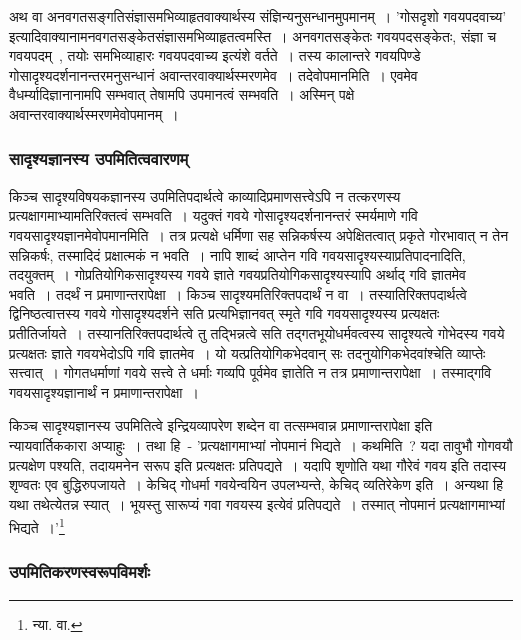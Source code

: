 		अथ वा अनवगतसङ्गतिसंज्ञासमभिव्याहृतवाक्यार्थस्य संज्ञिन्यनुसन्धानमुपमानम्~। 'गोसदृशो गवयपदवाच्य' इत्यादिवाक्यानामनवगतसङ्केतसंज्ञासमभिव्याहृतत्वमस्ति~। अनवगतसङ्केतः गवयपदसङ्केतः, संज्ञा च गवयपदम्~, तयोः समभिव्याहारः गवयपदवाच्य इत्यंशे वर्तते~।‌ तस्य कालान्तरे गवयपिण्डे गोसादृश्यदर्शनानन्तरमनुसन्धानं अवान्तरवाक्यार्थस्मरणमेव~। तदेवोपमानमिति~। एवमेव वैधर्म्यादिज्ञानानामपि सम्भवात् तेषामपि उपमानत्वं सम्भवति~। अस्मिन् पक्षे अवान्तरवाक्यार्थस्मरणमेवोपमानम्~।

		\subsubsection{सादृश्यज्ञानस्य उपमितित्ववारणम्}

		किञ्च सादृश्यविषयकज्ञानस्य उपमितिपदार्थत्वे काव्यादिप्रमाणसत्त्वेऽपि न तत्करणस्य प्रत्यक्षागमाभ्यामतिरिक्तत्वं सम्भवति~। यदुक्तं गवये गोसादृश्यदर्शनानन्तरं स्मर्यमाणे गवि गवयसादृश्यज्ञानमेवोपमानमिति~। तत्र प्रत्यक्षे धर्मिणा सह सन्निकर्षस्य अपेक्षितत्वात् प्रकृते गोरभावात् न तेन सन्निकर्षः, तस्मादिदं प्रक्षात्मकं न भवति~। नापि शाब्दं आप्तेन गवि गवयसादृश्यस्याप्रतिपादनादिति, तदयुक्तम्~। गोप्रतियोगिकसादृश्यस्य गवये ज्ञाते गवयप्रतियोगिकसादृश्यस्यापि अर्थाद् गवि  ज्ञातमेव भवति~। तदर्थं न प्रमाणान्तरापेक्षा~। किञ्च सादृश्यमतिरिक्तपदार्थं न वा~। तस्यातिरिक्तपदार्थत्वे द्विनिष्ठत्वात्तस्य गवये गोसादृश्यदर्शने सति प्रत्यभिज्ञानवत् स्मृते गवि गवयसादृश्यस्य प्रत्यक्षतः प्रतीतिर्जायते~। तस्यानतिरिक्तपदार्थत्वे तु तद्भिन्नत्वे सति तद्गतभूयोधर्मवत्वस्य सादृश्यत्वे गोभेदस्य गवये प्रत्यक्षतः ज्ञाते गवयभेदोऽपि गवि ज्ञातमेव~। यो यत्प्रतियोगिकभेदवान् सः तदनुयोगिकभेदवांश्चेति व्याप्तेः सत्त्वात्~। गोगतधर्माणां गवये सत्त्वे ते धर्माः गव्यपि पूर्वमेव ज्ञातेति न तत्र प्रमाणान्तरापेक्षा~। तस्माद्गवि गवयसादृश्यज्ञानार्थं न प्रमाणान्तरापेक्षा~।

		किञ्च सादृश्यज्ञानस्य उपमितित्वे इन्द्रियव्यापरेण शब्देन वा तत्सम्भवान्न प्रमाणान्तरापेक्षा इति न्यायवार्तिककारा अप्याहुः~। तथा हि~-  {\fontsize{11.7}{0}\selectfont\s 'प्रत्यक्षागमाभ्यां नोपमानं भिद्यते~। कथमिति~? यदा तावुभौ गोगवयौ प्रत्यक्षेण पश्यति, तदायमनेन सरूप इति प्रत्यक्षतः प्रतिपद्यते~। यदापि शृणोति यथा गौरेवं गवय इति तदास्य शृण्वतः एव बुद्धिरुपजायते~। केचिद् गोधर्मा गवयेन्वयिन उपलभ्यन्ते, केचिद् व्यतिरेकेण इति~। अन्यथा हि यथा तथेत्येतन्न स्यात्~। भूयस्तु सारूप्यं गवा गवयस्य इत्येवं प्रतिपद्यते~। तस्मात् नोपमानं प्रत्यक्षागमाभ्यां भिद्यते~।}'\footnote{न्या. वा. }

		\subsubsection{उपमितिकरणस्वरूपविमर्शः}

